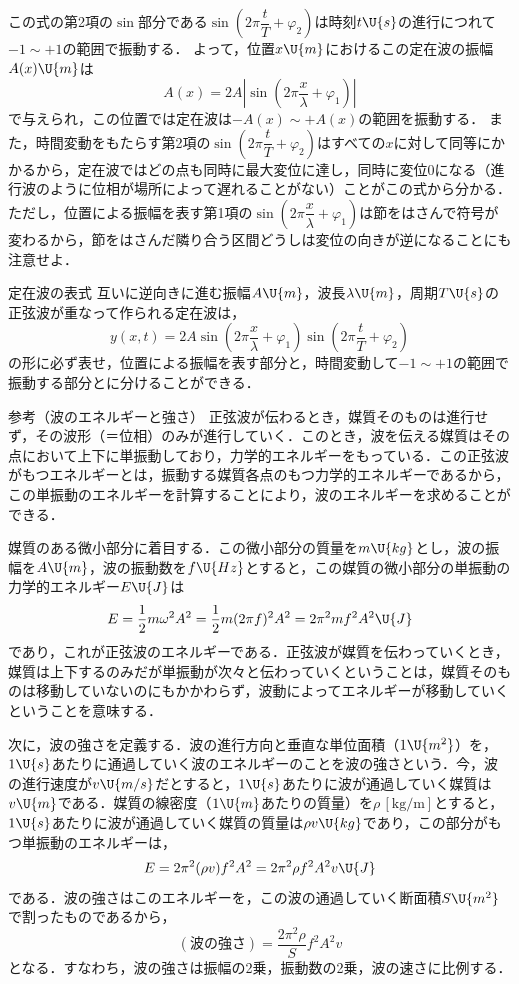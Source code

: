 この式の第2項の$\sin$部分である$\sin\left(2\pi\dfrac{t}{T}+\varphi_2\right)$は時刻$t\U{s}$の進行につれて$-1\sim+1$の範囲で振動する．
よって，位置$x\U{m}$におけるこの定在波の振幅$A(x)\U{m}$は
\[A(x)=2A\left|\sin\left(2\pi\frac{x}{\lambda}+\varphi_1\right)\right|\]
で与えられ，この位置では定在波は$-A(x)\sim+A(x)$の範囲を振動する．
また，時間変動をもたらす第2項の$\sin\left(2\pi\dfrac{t}{T}+\varphi_2\right)$はすべての$x$に対して同等にかかるから，{\gtfamily 定在波ではどの点も同時に最大変位に達し，同時に変位0になる}（進行波のように位相が場所によって遅れることがない）ことがこの式から分かる．
ただし，位置による振幅を表す第1項の$\sin\left(2\pi\dfrac{x}{\lambda}+\varphi_1\right)$は節をはさんで符号が変わるから，{\gtfamily 節をはさんだ隣り合う区間どうしは変位の向きが逆になる}ことにも注意せよ．

\begin{matome}{定在波の表式}
\hspace{3mm} 互いに逆向きに進む振幅$A\U{m}$，波長$\lambda\U{m}$，周期$T\U{s}$の正弦波が重なって作られる定在波は，
\[y(x,t)=2A\sin\left(2\pi\frac{x}{\lambda}+\varphi_1\right)\sin\left(2\pi\frac{t}{T}+\varphi_2\right)\]
の形に必ず表せ，位置による振幅を表す部分と，時間変動して$-1\sim+1$の範囲で振動する部分とに分けることができる．
\end{matome}

\begin{bsHosoku}{参考（波のエネルギーと強さ）}
正弦波が伝わるとき，媒質そのものは進行せず，その波形（＝位相）のみが進行していく．このとき，波を伝える媒質はその点において上下に単振動しており，力学的エネルギーをもっている．この正弦波がもつエネルギーとは，振動する媒質各点のもつ力学的エネルギーであるから，この単振動のエネルギーを計算することにより，波のエネルギーを求めることができる．

媒質のある微小部分に着目する．この微小部分の質量を$m\U{kg}$とし，波の振幅を$A\U{m}$，波の振動数を$f\U{Hz}$とすると，この媒質の微小部分の単振動の力学的エネルギー$E\U{J}$は
\[E=\frac{1}{2}m\omega^2A^2=\frac{1}{2}m(2\pi f)^2A^2=2\pi^2mf^2A^2\U{J}\]
であり，これが正弦波のエネルギーである．正弦波が媒質を伝わっていくとき，媒質は上下するのみだが単振動が次々と伝わっていくということは，媒質そのものは移動していないのにもかかわらず，波動によってエネルギーが移動していくということを意味する．

次に，波の強さを定義する．波の進行方向と垂直な単位面積（$1\U{m^2}$）を，$1\U{s}$あたりに通過していく波のエネルギーのことを波の強さという．今，波の進行速度が$v\U{m/s}$だとすると，$1\U{s}$あたりに波が通過していく媒質は$v\U{m}$である．媒質の線密度（$1\U{m}$あたりの質量）を$\rho\,[\mathrm{kg/m}]$とすると，$1\U{s}$あたりに波が通過していく媒質の質量は$\rho v\U{kg}$であり，この部分がもつ単振動のエネルギーは，
\[E=2\pi^2(\rho v)f^2A^2=2\pi^2\rho f^2A^2v\U{J}\]
である．波の強さはこのエネルギーを，この波の通過していく断面積$S\U{m^2}$で割ったものであるから，
\[(\text{波の強さ})=\frac{2\pi^2\rho}{S}f^2A^2v\]
となる．すなわち，{\gtfamily 波の強さは振幅の2乗，振動数の2乗，波の速さに比例する．}
\end{bsHosoku}


